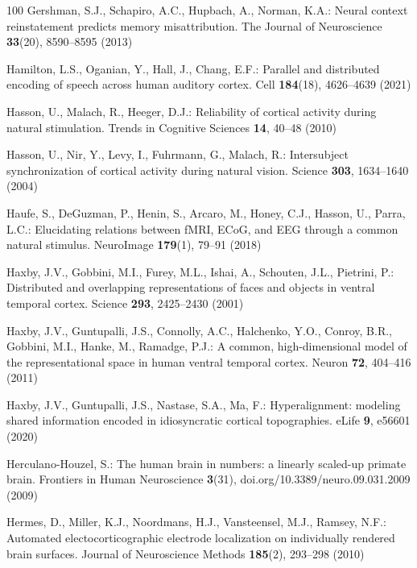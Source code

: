 \documentclass{llmxive}
\begin{document}
\begin{thebibliography}{100}
Gershman, S.J., Schapiro, A.C., Hupbach, A., Norman, K.A.: Neural context
  reinstatement predicts memory misattribution. The Journal of Neuroscience
  \textbf{33}(20),  8590--8595 (2013)

Hamilton, L.S., Oganian, Y., Hall, J., Chang, E.F.: Parallel and distributed
  encoding of speech across human auditory cortex. Cell  \textbf{184}(18),
  4626--4639 (2021)

Hasson, U., Malach, R., Heeger, D.J.: Reliability of cortical activity during
  natural stimulation. Trends in Cognitive Sciences  \textbf{14},  40--48
  (2010)

Hasson, U., Nir, Y., Levy, I., Fuhrmann, G., Malach, R.: Intersubject
  synchronization of cortical activity during natural vision. Science
  \textbf{303},  1634--1640 (2004)

Haufe, S., {DeGuzman}, P., Henin, S., Arcaro, M., Honey, C.J., Hasson, U.,
  Parra, L.C.: Elucidating relations between {fMRI}, {ECoG}, and {EEG} through
  a common natural stimulus. {NeuroImage}  \textbf{179}(1),  79--91 (2018)

Haxby, J.V., Gobbini, M.I., Furey, M.L., Ishai, A., Schouten, J.L., Pietrini,
  P.: Distributed and overlapping representations of faces and objects in
  ventral temporal cortex. Science  \textbf{293},  2425--2430 (2001)

Haxby, J.V., Guntupalli, J.S., Connolly, A.C., Halchenko, Y.O., Conroy, B.R.,
  Gobbini, M.I., Hanke, M., Ramadge, P.J.: A common, high-dimensional model of
  the representational space in human ventral temporal cortex. Neuron
  \textbf{72},  404--416 (2011)

Haxby, J.V., Guntupalli, J.S., Nastase, S.A., Ma, F.: Hyperalignment: modeling
  shared information encoded in idiosyncratic cortical topographies. {eLife}
  \textbf{9},  e56601 (2020)

Herculano-Houzel, S.: The human brain in numbers: a linearly scaled-up primate
  brain. Frontiers in Human Neuroscience  \textbf{3}(31),
  doi.org/10.3389/neuro.09.031.2009 (2009)

Hermes, D., Miller, K.J., Noordmans, H.J., Vansteensel, M.J., Ramsey, N.F.:
  Automated electocorticographic electrode localization on individually
  rendered brain surfaces. Journal of Neuroscience Methods  \textbf{185}(2),
  293--298 (2010)


\end{thebibliography}
\end{document}
